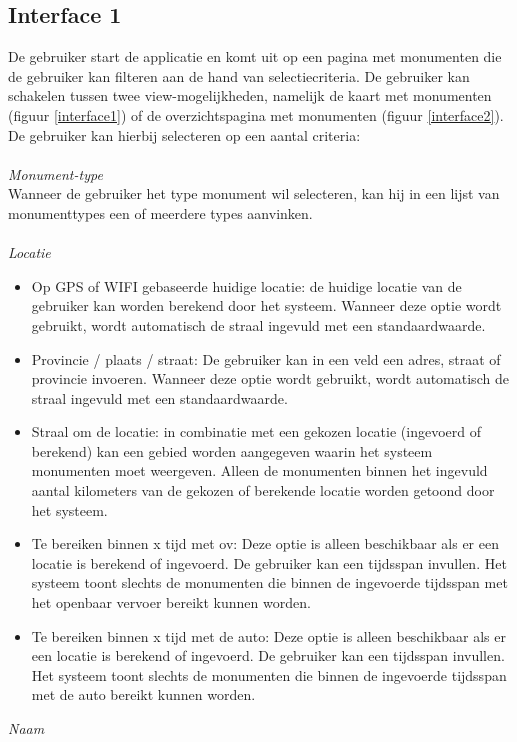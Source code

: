 \documentclass[a4paper,10pt]{article}
\begin{document}
			\subsection{Interface 1}
			De gebruiker start de applicatie en komt uit op een pagina met monumenten die de gebruiker kan filteren aan de hand van selectiecriteria. De gebruiker kan schakelen tussen twee view-mogelijkheden, namelijk de kaart met monumenten (figuur \ref{interface1}) of de overzichtspagina met monumenten (figuur \ref{interface2}). De gebruiker kan hierbij selecteren op een aantal criteria:\\
			\\
			\textit{Monument-type}\\
			Wanneer de gebruiker het type monument wil selecteren, kan hij in een lijst van monumenttypes een of meerdere types aanvinken.\\
			\\
			\textit{Locatie}
			\begin{itemize}
				\item Op GPS of WIFI gebaseerde huidige locatie: de huidige locatie van de gebruiker kan worden berekend door het systeem. Wanneer deze optie wordt gebruikt, wordt automatisch de straal ingevuld met een standaardwaarde. 
				\item Provincie / plaats / straat: De gebruiker kan in een veld een adres, straat of provincie invoeren. Wanneer deze optie wordt gebruikt, wordt automatisch de straal ingevuld met een standaardwaarde.
				\item Straal om de locatie: in combinatie met een gekozen locatie (ingevoerd of berekend) kan een gebied worden aangegeven waarin het systeem monumenten moet weergeven. Alleen de monumenten binnen het ingevuld aantal kilometers van de gekozen of berekende locatie worden getoond door het systeem.
				\item Te bereiken binnen x tijd met ov: Deze optie is alleen beschikbaar als er een locatie is berekend of ingevoerd. De gebruiker kan een tijdsspan invullen. Het systeem toont slechts de monumenten die binnen de ingevoerde tijdsspan met het openbaar vervoer bereikt kunnen worden.
				\item Te bereiken binnen x tijd met de auto: Deze optie is alleen beschikbaar als er een locatie is berekend of ingevoerd. De gebruiker kan een tijdsspan invullen. Het systeem toont slechts de monumenten die binnen de ingevoerde tijdsspan met de auto bereikt kunnen worden.
			\end{itemize}
			\textit{Naam}\\
\end{document}
